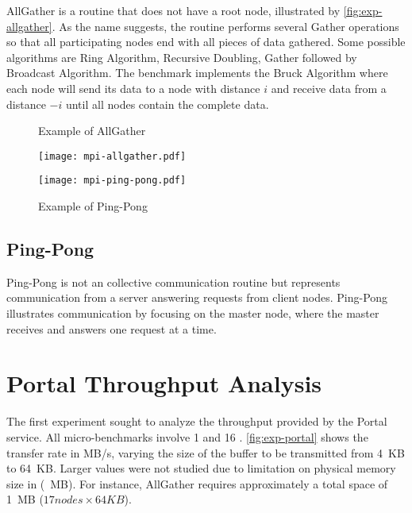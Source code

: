 			AllGather is a routine that does not have a root node, illustrated by
			\autoref{fig:exp-allgather}. As the name suggests, the routine performs
			several Gather operations so that all participating nodes end with all
			pieces of data gathered. Some possible algorithms are Ring Algorithm,
			Recursive Doubling, Gather followed by Broadcast Algorithm. The benchmark
			implements the Bruck Algorithm where each node will send its data to a node
			with distance $i$ and receive data from a distance $-i$ until all nodes
			contain the complete data.
			
			\begin{figure}[!tb]
				\centering

				\begin{minipage}{.4\textwidth}
					\centering%
					\caption{Example of \mpi AllGather}%
					\label{fig:exp-allgather}%
					\texttt{[image: mpi-allgather.pdf]}%
				\end{minipage}%
				\hspace{1cm}%
				\begin{minipage}{.4\textwidth}
					\centering%
					\caption{Example of Ping-Pong}%
					\label{fig:exp-ping-pong}%
					\texttt{[image: mpi-ping-pong.pdf]}%
				\end{minipage}%
			\end{figure}

		\subsection{Ping-Pong}

			Ping-Pong is not an \mpi collective communication routine but represents
			communication from a server answering requests from client nodes.
			Ping-Pong illustrates communication by focusing on the master node,
			where the master receives and answers one request at a time.


	\section{Portal Throughput Analysis}

		The first experiment sought to analyze the throughput provided
		by the Portal service. All micro-benchmarks involve 1 \iocluster
		and 16 \cclusters.  \autoref{fig:exp-portal} shows the transfer
		rate in MB/s, varying the size of the buffer to be transmitted
		from 4~KB to 64~KB. Larger values were not studied due to
		limitation on physical memory size in \cclusters (~MB).
		For instance, AllGather requires approximately a total space of
		1~MB ($17 nodes \times 64 KB$).

